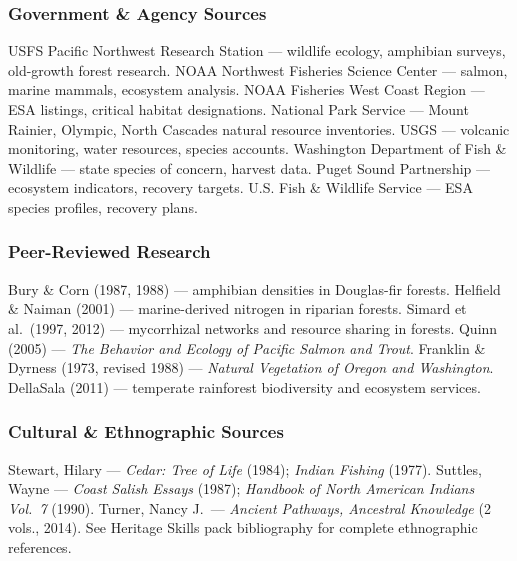 \documentclass[11pt,letterpaper]{article}
\newcommand{\stageheader}[2]{%
  \noindent\colorbox{#2}{\makebox[\textwidth][l]{%
    \textcolor{white}{\bfseries\sffamily\hspace{6pt}#1\hspace{6pt}}}}%
  \vspace{0.5em}\par%
}
\begin{document}
\subsubsection{Government \& Agency Sources}

USFS Pacific Northwest Research Station --- wildlife ecology, amphibian surveys, old-growth forest research. NOAA Northwest Fisheries Science Center --- salmon, marine mammals, ecosystem analysis. NOAA Fisheries West Coast Region --- ESA listings, critical habitat designations. National Park Service --- Mount Rainier, Olympic, North Cascades natural resource inventories. USGS --- volcanic monitoring, water resources, species accounts. Washington Department of Fish \& Wildlife --- state species of concern, harvest data. Puget Sound Partnership --- ecosystem indicators, recovery targets. U.S. Fish \& Wildlife Service --- ESA species profiles, recovery plans.

\subsubsection{Peer-Reviewed Research}

Bury \& Corn (1987, 1988) --- amphibian densities in Douglas-fir forests. Helfield \& Naiman (2001) --- marine-derived nitrogen in riparian forests. Simard et al.\ (1997, 2012) --- mycorrhizal networks and resource sharing in forests. Quinn (2005) --- \emph{The Behavior and Ecology of Pacific Salmon and Trout}. Franklin \& Dyrness (1973, revised 1988) --- \emph{Natural Vegetation of Oregon and Washington}. DellaSala (2011) --- temperate rainforest biodiversity and ecosystem services.

\subsubsection{Cultural \& Ethnographic Sources}

Stewart, Hilary --- \emph{Cedar: Tree of Life} (1984); \emph{Indian Fishing} (1977). Suttles, Wayne --- \emph{Coast Salish Essays} (1987); \emph{Handbook of North American Indians Vol.\ 7} (1990). Turner, Nancy J.\ --- \emph{Ancient Pathways, Ancestral Knowledge} (2 vols., 2014). See Heritage Skills pack bibliography for complete ethnographic references.

\newpage

\stageheader{STAGE 3 --- MISSION PACKAGE}{tertiary}
\end{document}
